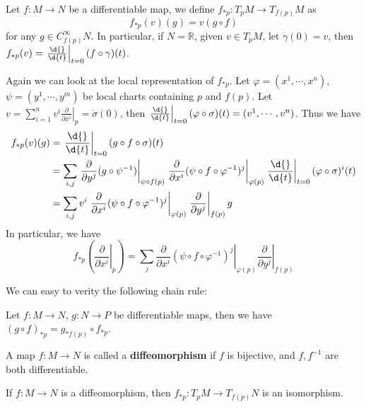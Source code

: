 \begin{defn}
    Let $f:M\to N$ be a differentiable map, we define $f_{*p}:T_pM\to T_{f(p)}M$ as
    \[f_{*p}(v)(g)=v(g\circ f)\]
    for any $g\in C^\infty_{f(p)}N$.
    In particular, if $N=\mathbb{R}$, given $v\in T_pM$, let $\dot{\gamma}(0)=v$, then $f_{*p}(v)=\left.\frac{\d{}}{\d{t}}\right|_{t=0}(f\circ\gamma)(t)$.
\end{defn}

Again we can look at the local representation of $f_{*p}$.
Let $\varphi=(x^1,\cdots,x^n)$, $\psi=(y^1,\cdots,y^m)$ be local charts containing $p$ and $f(p)$.
Let $v=\sum_{i=1}^nv^i\left.\frac{\partial{}}{\partial{x^i}}\right|_p=\dot{\sigma}(0)$, then $\left.\frac{\d{}}{\d{t}}\right|_{t=0}(\varphi\circ\sigma)(t)=(v^1,\cdots,v^n)$.
Thus we have
\begin{align*}
    f_{*p}(v)(g)&=\left.\frac{\d{}}{\d{t}}\right|_{t=0}(g\circ f\circ\sigma)(t)\\
    &=\sum_{i,j}\left.\frac{\partial{}}{\partial{y^j}}(g\circ\psi^{-1})\right|_{\psi\circ f(p)}\left.\frac{\partial{}}{\partial{x^i}}(\psi\circ f\circ\varphi^{-1})^j\right|_{\varphi(p)}\left.\frac{\d{}}{\d{t}}\right|_{t=0}(\varphi\circ\sigma)^i(t)\\
    &=\sum_{i,j}v^i\left.\frac{\partial{}}{\partial{x^i}}(\psi\circ f\circ\varphi^{-1})^j\right|_{\varphi(p)}\left.\frac{\partial{}}{\partial{y^j}}\right|_{f(p)}g
\end{align*}
In particular, we have
\[f_{*p}\left(\left.\frac{\partial{}}{\partial{x^i}}\right|_p\right)=\sum_j\left.\frac{\partial{}}{\partial{x^i}}(\psi\circ f\circ\varphi^{-1})^j\right|_{\varphi(p)}\left.\frac{\partial{}}{\partial{y^j}}\right|_{f(p)}\]

We can easy to verity the following chain rule:
\begin{prop}
    Let $f:M\to N$, $g:N\to P$ be differentiable maps, then we have $(g\circ f)_{*p}=g_{*f(p)}\circ f_{*p}$.
\end{prop}

\begin{defn}[Diffeomorphism]
    A map $f:M\to N$ is called a \textbf{diffeomorphism} if $f$ is bijective, and $f,f^{-1}$ are both differentiable.
\end{defn}

\begin{prop}\label{diffeo to iso}
    If $f:M\to N$ is a diffeomorphism, then $f_{*p}:T_pM\to T_{f(p)}N$ is an isomorphism.
\end{prop}

